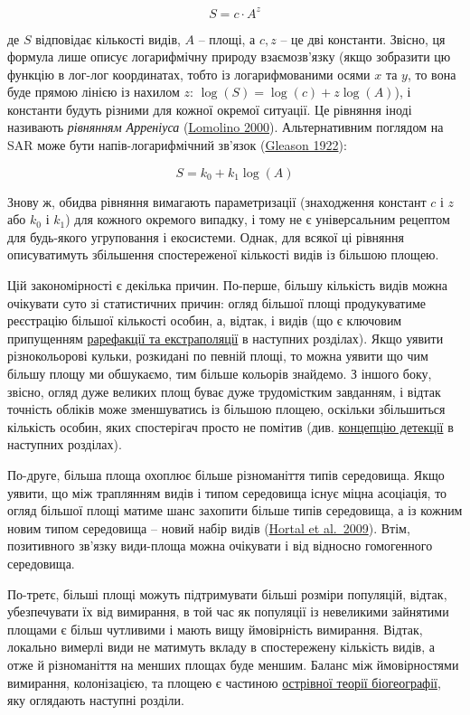 \documentclass[
  11pt,
]{book}
\begin{document}
\[S = c \cdot A ^ z\]

де \(S\) відповідає кількості видів, \(A\) -- площі, а \(c, z\) -- це дві константи. Звісно, ця формула лише описує логарифмічну природу взаємозв'язку (якщо зобразити цю функцію в лог-лог координатах, тобто із логарифмованими осями \(x\) та \(y\), то вона буде прямою лінією із нахилом \(z\): \(\log(S) = \log(c) + z \log(A)\)), і константи будуть різними для кожної окремої ситуації. Це рівняння іноді називають \emph{рівнянням Арреніуса} (\href{https://www.jstor.org/stable/2655979}{Lomolino 2000}). Альтернативним поглядом на SAR може бути напів-логарифмічний зв'язок (\href{https://doi.org/10.2307/1929150}{Gleason 1922}):

\[S = k_0  + k_1 \log(A)\]

Знову ж, обидва рівняння вимагають параметризації (знаходження констант \(c\) і \(z\) або \(k_0\) і \(k_1\)) для кожного окремого випадку, і тому не є універсальним рецептом для будь-якого угруповання і екосистеми. Однак, для всякої ці рівняння описуватимуть збільшення спостереженої кількості видів із більшою площею.

Цій закономірності є декілька причин. По-перше, більшу кількість видів можна очікувати суто зі статистичних причин: огляд більшої площі продукуватиме реєстрацію більшої кількості особин, а, відтак, і видів (що є ключовим припущенням \hyperref[rarefaction]{рарефакції та екстраполяції} в наступних розділах). Якщо уявити різнокольорові кульки, розкидані по певній площі, то можна уявити що чим більшу площу ми обшукаємо, тим більше кольорів знайдемо. З іншого боку, звісно, огляд дуже великих площ буває дуже трудомістким завданням, і відтак точність обліків може зменшуватись із більшою площею, оскільки збільшиться кількість особин, яких спостерігач просто не помітив (див. \hyperref[detectability]{концепцію детекції} в наступних розділах).

По-друге, більша площа охоплює більше різноманіття типів середовища. Якщо уявити, що між траплянням видів і типом середовища існує міцна асоціація, то огляд більшої площі матиме шанс захопити більше типів середовища, а із кожним новим типом середовища -- новий набір видів (\href{https://doi.org/10.1086/645085}{Hortal et al.~2009}). Втім, позитивного зв'язку види-площа можна очікувати і від відносно гомогенного середовища.

По-третє, більші площі можуть підтримувати більші розміри популяцій, відтак, убезпечувати їх від вимирання, в той час як популяції із невеликими зайнятими площами є більш чутливими і мають вищу ймовірність вимирання. Відтак, локально вимерлі види не матимуть вкладу в спостережену кількість видів, а отже й різноманіття на менших площах буде меншим. Баланс між ймовірностями вимирання, колонізацією, та площею є частиною \hyperref[islands]{острівної теорії біогеографії}, яку оглядають наступні розділи.
\end{document}
